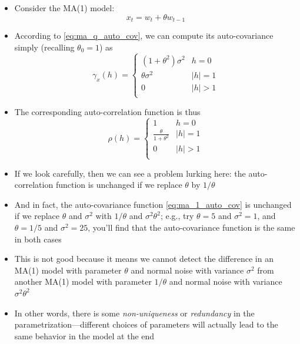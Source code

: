 \documentclass{article}
\begin{document}
\begin{itemize}
\item Consider the MA(1) model:
  \begin{equation}
  \label{eq:ma_1}
  x_t = w_t + \theta w_{t-1}
  \end{equation}

\item According to \eqref{eq:ma_q_auto_cov}, we can compute its auto-covariance 
  simply (recalling $\theta_0 = 1$) as
  \begin{equation}
  \label{eq:ma_1_auto_cov}  
  \gamma_x(h) = \begin{cases}
  (1+\theta^2) \sigma^2 & h = 0 \\
  \theta \sigma^2 & |h| = 1 \\
  0 & |h| > 1 \\
  \end{cases}
  \end{equation}

\item The corresponding auto-correlation function is thus
  \[
  \rho(h) = \begin{cases}
  1 & h = 0 \\
  \frac{\theta}{1+\theta^2} & |h| = 1 \\ 
  0 & |h| > 1 \\
  \end{cases}
  \]

\item If we look carefully, then we can see a problem lurking here: the
  auto-correlation function is unchanged if we replace $\theta$ by $1/\theta$

\item And in fact, the auto-covariance function \eqref{eq:ma_1_auto_cov} is
  unchanged if we replace $\theta$ and $\sigma^2$ with $1/\theta$ and $\sigma^2
  \theta^2$; e.g., try $\theta = 5$ and $\sigma^2 = 1$, and $\theta = 1/5$ and
  $\sigma^2 = 25$, you'll find that the auto-covariance function is the same in
  both cases 

\item This is not good because it means we cannot detect the difference in an
  MA(1) model with parameter $\theta$ and normal noise with variance $\sigma^2$ 
  from another MA(1) model with parameter $1/\theta$ and normal noise with
  variance $\sigma^2 \theta^2$

\item In other words, there is some \emph{non-uniqueness} or \emph{redundancy}
  in the parametrization---different choices of parameters will actually lead to
  the same behavior in the model at the end


\end{itemize}
\end{document}
